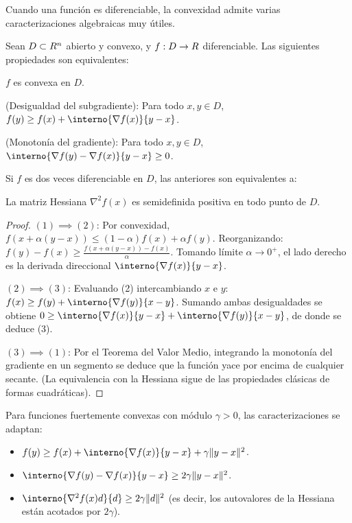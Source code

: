 Cuando una función es diferenciable, la convexidad admite varias caracterizaciones algebraicas muy útiles.

\begin{theorem}\label{v1:thm:3.4.5}
 Sean $D \subset R^n$ abierto y convexo, y $f : D \to R$ diferenciable. Las siguientes propiedades son equivalentes:
 \begin{enuthm}
 \item $f$ es convexa en $D$.
 \item (Desigualdad del subgradiente): Para todo $x, y \in D$, $f(y) \ge f(x) + \interno{\nabla f(x)}{y-x}$.
 \item (Monotonía del gradiente): Para todo $x, y \in D$, $\interno{\nabla f(y) - \nabla f(x)}{y-x} \ge 0$.
 \end{enuthm}
 Si $f$ es dos veces diferenciable en $D$, las anteriores son equivalentes a:
 \begin{enuthm}
 \item[4.] La matriz Hessiana $\nabla^2 f(x)$ es semidefinida positiva en todo punto de $D$.
 \end{enuthm}
\end{theorem}

\begin{proof}
 $(1) \implies (2)$: Por convexidad, $f(x + \alpha(y-x)) \le (1-\alpha)f(x) + \alpha f(y)$. Reorganizando: $f(y) - f(x) \ge \frac{f(x+\alpha(y-x)) - f(x)}{\alpha}$. Tomando límite $\alpha \to 0^+$, el lado derecho es la derivada direccional $\interno{\nabla f(x)}{y-x}$.
 
 $(2) \implies (3)$: Evaluando (2) intercambiando $x$ e $y$: $f(x) \ge f(y) + \interno{\nabla f(y)}{x-y}$. Sumando ambas desigualdades se obtiene $0 \ge \interno{\nabla f(x)}{y-x} + \interno{\nabla f(y)}{x-y}$, de donde se deduce (3).
 
 $(3) \implies (1)$: Por el Teorema del Valor Medio, integrando la monotonía del gradiente en un segmento se deduce que la función yace por encima de cualquier secante. (La equivalencia con la Hessiana sigue de las propiedades clásicas de formas cuadráticas).
\end{proof}

\begin{remark}
 Para funciones fuertemente convexas con módulo $\gamma > 0$, las caracterizaciones se adaptan:
 \begin{itemize}
 \item $f(y) \ge f(x) + \interno{\nabla f(x)}{y-x} + \gamma \norm{y-x}^2$.
 \item $\interno{\nabla f(y) - \nabla f(x)}{y-x} \ge 2\gamma \norm{y-x}^2$.
 \item $\interno{\nabla^2 f(x)d}{d} \ge 2\gamma \norm{d}^2$ (es decir, los autovalores de la Hessiana están acotados por $2\gamma$).
 \end{itemize}
\end{remark}

